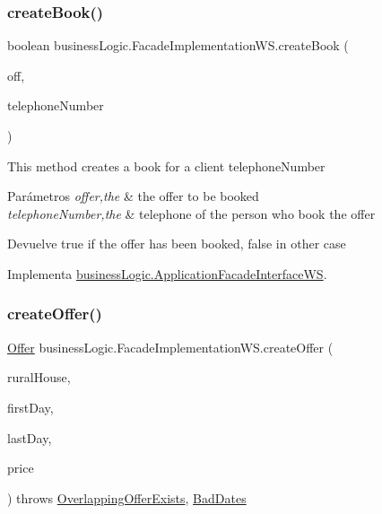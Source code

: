 \subsubsection{\texorpdfstring{createBook()}{createBook()}}
{\footnotesize\ttfamily boolean business\+Logic.\+Facade\+Implementation\+W\+S.\+create\+Book (\begin{DoxyParamCaption}\item[{\mbox{\hyperlink{classdomain_1_1_offer}{Offer}}}]{off,  }\item[{String}]{telephone\+Number }\end{DoxyParamCaption})}

This method creates a book for a client telephone\+Number


\begin{DoxyParams}{Parámetros}
{\em offer,the} & the offer to be booked \\
\hline
{\em telephone\+Number,the} & telephone of the person who book the offer \\
\hline
\end{DoxyParams}
\begin{DoxyReturn}{Devuelve}
true if the offer has been booked, false in other case 
\end{DoxyReturn}


Implementa \mbox{\hyperlink{interfacebusiness_logic_1_1_application_facade_interface_w_s_a1fd4f6fccc600ed8127e06fa34a10512}{business\+Logic.\+Application\+Facade\+Interface\+WS}}.

\mbox{\label{classbusiness_logic_1_1_facade_implementation_w_s_ac7b3bdfd0815ea7c787da312de594cce}} 
\subsubsection{\texorpdfstring{createOffer()}{createOffer()}}
{\footnotesize\ttfamily \mbox{\hyperlink{classdomain_1_1_offer}{Offer}} business\+Logic.\+Facade\+Implementation\+W\+S.\+create\+Offer (\begin{DoxyParamCaption}\item[{\mbox{\hyperlink{classdomain_1_1_rural_house}{Rural\+House}}}]{rural\+House,  }\item[{Date}]{first\+Day,  }\item[{Date}]{last\+Day,  }\item[{float}]{price }\end{DoxyParamCaption}) throws \mbox{\hyperlink{classexceptions_1_1_overlapping_offer_exists}{Overlapping\+Offer\+Exists}}, \mbox{\hyperlink{classexceptions_1_1_bad_dates}{Bad\+Dates}}}

